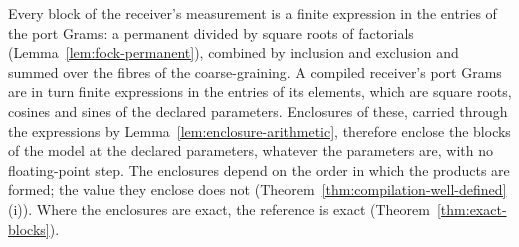 
Every block of the receiver's measurement is a finite expression in the
entries of the port Grams: a permanent divided by square roots of factorials
(Lemma~\ref{lem:fock-permanent}), combined by inclusion and exclusion and
summed over the fibres of the coarse-graining. A compiled receiver's port
Grams are in turn finite expressions in the entries of its elements, which are
square roots, cosines and sines of the declared parameters. Enclosures of
these, carried through the expressions by
Lemma~\ref{lem:enclosure-arithmetic}, therefore enclose the blocks of the
model at the declared parameters, whatever the parameters are, with no
floating-point step. The enclosures depend on the order in which the products
are formed; the value they enclose does not
(Theorem~\ref{thm:compilation-well-defined}\,(i)). Where the enclosures are
exact, the reference is exact (Theorem~\ref{thm:exact-blocks}).

